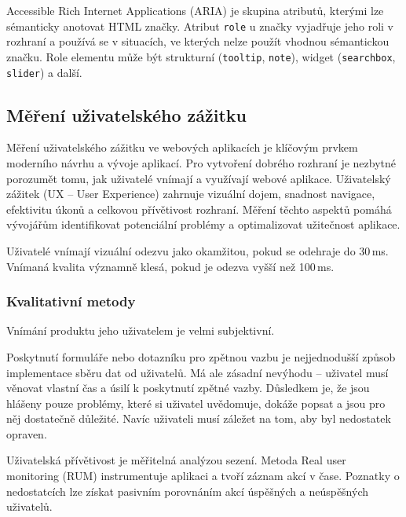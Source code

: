 Accessible Rich Internet Applications (ARIA) je skupina atributů, kterými lze sémanticky anotovat HTML značky.
Atribut \texttt{role} u značky vyjadřuje jeho roli v rozhraní a používá se v situacích, ve kterých nelze použít vhodnou sémantickou značku.
Role elementu může být strukturní (\texttt{tooltip}, \texttt{note}), widget (\texttt{searchbox}, \texttt{slider}) a další.

\subsection{Měření uživatelského zážitku}

Měření uživatelského zážitku ve webových aplikacích je klíčovým prvkem moderního návrhu a vývoje aplikací.
Pro vytvoření dobrého rozhraní je nezbytné porozumět tomu, jak uživatelé vnímají a využívají webové aplikace.
Uživatelský zážitek (UX -- User Experience) zahrnuje vizuální dojem, snadnost navigace, efektivitu úkonů a celkovou přívětivost rozhraní.
Měření těchto aspektů pomáhá vývojářům identifikovat potenciální problémy a optimalizovat užitečnost aplikace.

Uživatelé vnímají vizuální odezvu jako okamžitou, pokud se odehraje do 30\,ms.
Vnímaná kvalita významně klesá, pokud je odezva vyšší než 100\,ms. \cite{interactivityDelay}


\subsubsection{Kvalitativní metody}

Vnímání produktu jeho uživatelem je velmi subjektivní.

Poskytnutí formuláře nebo dotazníku pro zpětnou vazbu je nejjednodušší způsob implementace sběru dat od uživatelů.
Má ale zásadní nevýhodu -- uživatel musí věnovat vlastní čas a úsilí k poskytnutí zpětné vazby.
Důsledkem je, že jsou hlášeny pouze problémy, které si uživatel uvědomuje, dokáže popsat a jsou pro něj dostatečně důležité.
Navíc uživateli musí záležet na tom, aby byl nedostatek opraven.

Uživatelská přívětivost je měřitelná analýzou sezení.
Metoda Real user monitoring (RUM) instrumentuje aplikaci a tvoří záznam akcí v čase.
Poznatky o nedostatcích lze získat pasivním porovnáním akcí úspěšných a neúspěšných uživatelů.

